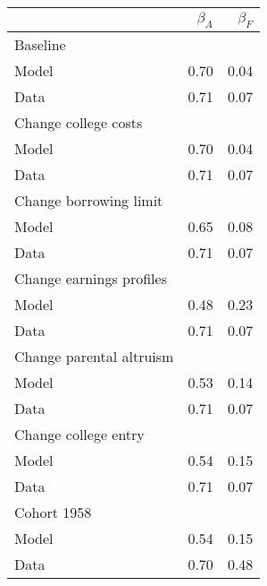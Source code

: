 \begin{tabular}{lrr}
\hline
  & $\beta_{A}$  & $\beta_{F}$  \\ 
\hline
Baseline &   &   \\ 
Model & 0.70  & 0.04  \\ 
Data & 0.71  & 0.07  \\ 
Change college costs &   &   \\ 
Model & 0.70  & 0.04  \\ 
Data & 0.71  & 0.07  \\ 
Change borrowing limit &   &   \\ 
Model & 0.65  & 0.08  \\ 
Data & 0.71  & 0.07  \\ 
Change earnings profiles &   &   \\ 
Model & 0.48  & 0.23  \\ 
Data & 0.71  & 0.07  \\ 
Change parental altruism &   &   \\ 
Model & 0.53  & 0.14  \\ 
Data & 0.71  & 0.07  \\ 
Change college entry &   &   \\ 
Model & 0.54  & 0.15  \\ 
Data & 0.71  & 0.07  \\ 
Cohort 1958 &   &   \\ 
Model & 0.54  & 0.15  \\ 
Data & 0.70  & 0.48  \\ 
\hline
\end{tabular}%
